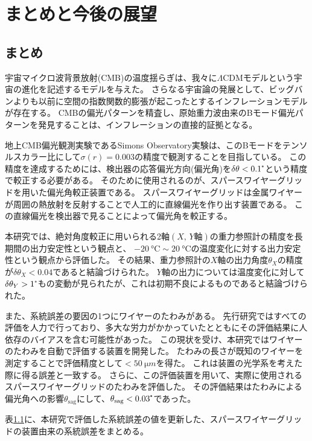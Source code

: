 \documentclass[../../main.tex]{subfiles}
\begin{document}
\chapter{まとめと今後の展望}
\section{まとめ}
宇宙マイクロ波背景放射(CMB)の温度揺らぎは、我々に$\Lambda \mathrm{CDM}$モデルという宇宙の進化を記述するモデルを与えた。
さらなる宇宙論の発展として、ビッグバンよりも以前に空間の指数関数的膨張が起こったとするインフレーションモデルが存在する。
CMBの偏光パターンを精査し、原始重力波由来のBモード偏光パターンを発見することは、インフレーションの直接的証拠となる。

地上CMB偏光観測実験であるSimons Observatory実験は、このBモードをテンソルスカラー比にして$\sigma(r)=0.003$の精度で観測することを目指している。
この精度を達成するためには、検出器の応答偏光方向(偏光角)を$\delta\theta<0.1\tcdegree$という精度で較正する必要がある。
そのために使用されるのが、スパースワイヤーグリッドを用いた偏光角較正装置である。
スパースワイヤーグリッドは金属ワイヤーが周囲の熱放射を反射することで人工的に直線偏光を作り出す装置である。
この直線偏光を検出器で見ることによって偏光角を較正する。

本研究では、絶対角度較正に用いられる2軸$(X,\,Y\text{軸})$の重力参照計の精度を長期間の出力安定性という観点と、
$\SI{-20}{\degreeCelsius}\sim\SI{20}{\degreeCelsius}$の温度変化に対する出力安定性という観点から評価した。
その結果、重力参照計の$X$軸の出力角度$\theta_{X}$の精度が$\delta\theta_{X}<0.04$であると結論づけられた。
$Y$軸の出力については温度変化に対して$\delta\theta_{Y}>1\tcdegree$もの変動が見られたが、これは初期不良によるものであると結論づけられた。

また、系統誤差の要因の1つにワイヤーのたわみがある。
先行研究ではすべての評価を人力で行っており、多大な労力がかかっていたとともにその評価結果に人依存のバイアスを含む可能性があった。
この現状を受け、本研究ではワイヤーのたわみを自動で評価する装置を開発した。
たわみの長さが既知のワイヤーを測定することで評価精度として$<\SI{50}{\micro m}$を得た。
これは装置の光学系を考えた際に得る誤差と一致する。
さらに、この評価装置を用いて、実際に使用されるスパースワイヤーグリッドのたわみを評価した。
その評価結果はたわみによる偏光角への影響$\theta_{\mathrm{sag}}$にして、$\theta_{\mathrm{sag}}<0.03\tcdegree$であった。

表\ref{}に、本研究で評価した系統誤差の値を更新した、スパースワイヤーグリッドの装置由来の系統誤差をまとめる。
\end{document}
